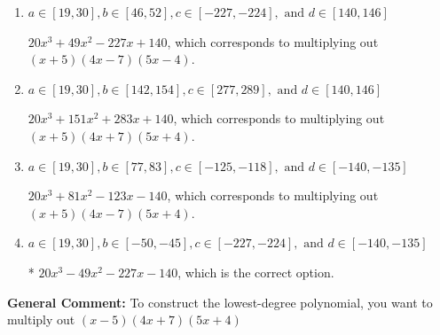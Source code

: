 \documentclass{extbook}[14pt]
\begin{document}
\begin{enumerate}
{\begin{enumerate}[label=\Alph*.]
$20x^{3} -49 x^{2} -227 x + 140$, which corresponds to multiplying everything correctly except the constant term.
\item \( a \in [19, 30], b \in [46, 52], c \in [-227, -224], \text{ and } d \in [140, 146] \)

$20x^{3} +49 x^{2} -227 x + 140$, which corresponds to multiplying out $(x + 5)(4x -7)(5x -4)$.
\item \( a \in [19, 30], b \in [142, 154], c \in [277, 289], \text{ and } d \in [140, 146] \)

$20x^{3} +151 x^{2} +283 x + 140$, which corresponds to multiplying out $(x + 5)(4x + 7)(5x + 4)$.
\item \( a \in [19, 30], b \in [77, 83], c \in [-125, -118], \text{ and } d \in [-140, -135] \)

$20x^{3} +81 x^{2} -123 x -140$, which corresponds to multiplying out $(x + 5)(4x -7)(5x + 4)$.
\item \( a \in [19, 30], b \in [-50, -45], c \in [-227, -224], \text{ and } d \in [-140, -135] \)

* $20x^{3} -49 x^{2} -227 x -140$, which is the correct option.
\end{enumerate}

\textbf{General Comment:} To construct the lowest-degree polynomial, you want to multiply out $(x -5)(4x + 7)(5x + 4)$
}
\end{enumerate}
\end{document}
